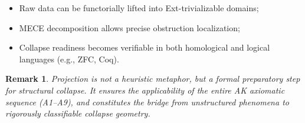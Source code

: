 \documentclass[11pt]{article}
\newtheorem{remark}[theorem]{Remark}
\begin{document}
\begin{itemize}
  \item Raw data can be functorially lifted into Ext-trivializable domains;
  \item MECE decomposition allows precise obstruction localization;
  \item Collapse readiness becomes verifiable in both homological and logical languages (e.g., ZFC, Coq).
\end{itemize}

\begin{remark}
Projection is not a heuristic metaphor, but a formal preparatory step for structural collapse.  
It ensures the applicability of the entire AK axiomatic sequence (A1--A9), and constitutes the bridge  
from unstructured phenomena to rigorously classifiable collapse geometry.
\end{remark}
\end{document}
